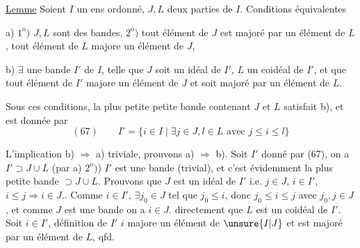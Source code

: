 
\uline{Lemme} Soient $I$ un ens ordonné, $J,L$ deux parties de $I$. Conditions équivalentes

a) $1^{\mathrm o})$ $J,L$ sont des bandes, $2^{\mathrm o})$ tout élément de $J$ est majoré par un élément de $L$, tout élément de $L$ majore un élément de $J$, 

b) $\exists$ une bande $I'$ de $I$, telle que $J$ soit un idéal de $I'$, $L$ un coidéal de $I'$, et que tout élément de $I'$ majore un élément de $J$ et soit majoré par un élément de $L$.

Sous ces conditions,    la plus petite petite bande  contenant $J$ et $L$ satisfait b), et est donnée par
\[
(67)\qquad I'=\{i\in I\mid\exists j\in J,l\in L\text{ avec }j\leq i\leq l\}
\]

 L'implication b) $\Rightarrow$ a) triviale,  prouvons a) $\Rightarrow$ b). Soit $I'$ donné par (67), on a $I'\supset J\cup L$ (par a) $2^{\mathrm o})$) $I'$ est une bande (trivial), et c'est évidemment la plus petite bande $\supset J\cup L$. Prouvons que $J$ est un idéal de $I'$ i.e. $j\in J$, $i\in I'$, $i\leq j\Rightarrow i\in J$.. Comme $i\in I'$, $\exists j_0\in J$ tel que $j_0\leq i$, donc $j_0\leq i\leq j$ avec $j_0,j\in J$, et comme $J$ est une bande  on a $i\in J$.  directement que $L$ est un coidéal de $I'$. Soit $i\in I'$,  définition de $I'$ $i$ majore un élément de $\unsure{I|J}$ et est majoré par un élément de $L$, qfd.
